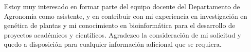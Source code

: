 \documentclass[11pt, letterpaper]{awesome-cv} %
\begin{document}
\begin{cvletter}


Estoy muy interesado en formar parte del equipo docente del Departamento de Agronomía como asistente, y en contribuir con mi experiencia en investigación en genética de plantas y mi conocimiento en bioinformática para el desarrollo de proyectos académicos y científicos. Agradezco la consideración de mi solicitud y quedo a disposición para cualquier información adicional que se requiera.


\end{cvletter}


\makeletterclosing %
\end{document}
